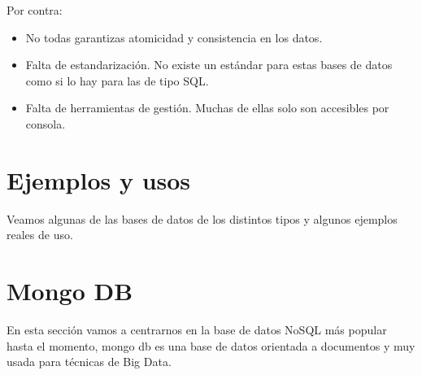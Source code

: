 Por contra:

\begin{itemize}
    \item No todas garantizas atomicidad y consistencia en los datos.
    \item Falta de estandarización. No existe un estándar para estas bases de datos como si lo hay para las de tipo SQL.
    \item Falta de herramientas de gestión. Muchas de ellas solo son accesibles por consola.
\end{itemize}


\section{Ejemplos y usos}

Veamos algunas de las bases de datos de los distintos tipos y algunos ejemplos reales de uso.


\section{Mongo DB}

En esta sección vamos a centrarnos en la base de datos NoSQL más popular hasta el momento, mongo db es una base de datos orientada a documentos y muy usada para técnicas de Big Data.
